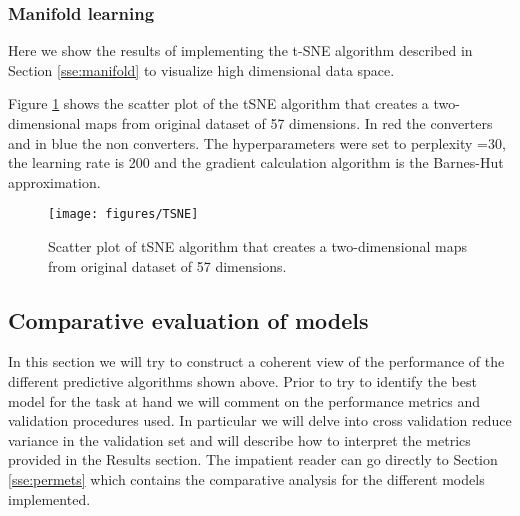 \documentclass[11pt]{article}
\theoremstyle{definition}
\theoremstyle{remark}
\begin{document}
\subsubsection{Manifold learning}
\label{sse:resmanifold}
Here we show the results of implementing the t-SNE algorithm described in Section \ref{sse:manifold} to visualize high dimensional data space.


Figure \ref{fig:TSNE} shows the scatter plot of the tSNE algorithm that creates a two-dimensional maps from original dataset of 57 dimensions. In red the converters and in blue the non converters. The hyperparameters were set to perplexity =30, the learning rate is 200 and the  gradient calculation algorithm is the Barnes-Hut approximation.

\begin{figure}[H] 
        \centering
        \texttt{[image: figures/TSNE]}
        \caption{Scatter plot of tSNE algorithm that creates a two-dimensional maps from original dataset of 57 dimensions. 
        } \label{fig:TSNE}
\end{figure}


\subsection{Comparative evaluation of models}
\label{se:compare}
In this section we will try to construct a coherent view of the performance of the different predictive algorithms shown above. 
Prior to try to identify the best model for the task at hand we will comment on the performance metrics and validation procedures used. In particular we will delve into cross validation reduce variance in the validation set and will describe how to interpret the metrics provided in the Results section. The impatient reader can go directly to Section \ref{sse:permets} which contains the comparative analysis for the different models implemented.
\end{document}
